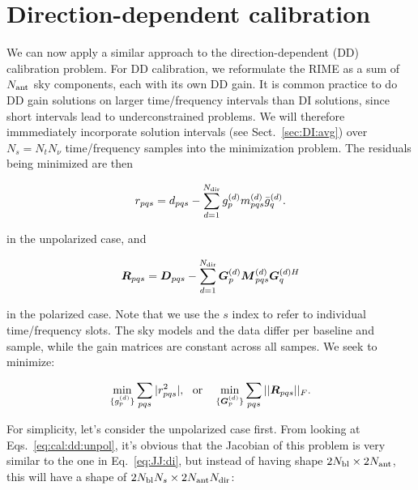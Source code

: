 \documentclass[useAMS,usenatbib]{mn2e}
\newcommand{\mat}[1]{{\bmath{#1}}}
\newcommand{\DD}{\mat{D}}
\newcommand{\MM}{\mat{M}}
\newcommand{\RR}{\mat{R}}
\newcommand{\GG}{\mat{G}}
\begin{document}
\section{Direction-dependent calibration}

\newcommand{\Ns}{N_s}

We can now apply a similar approach to the direction-dependent (DD) calibration problem. For DD calibration, we reformulate
the RIME as a sum of $N_\mathrm{ant}$ sky components, each with its own DD gain. 
It is common practice to do DD gain solutions on larger time/frequency intervals than DI 
solutions, since short intervals lead to underconstrained
problems. We will therefore immmediately incorporate solution intervals (see Sect.~\ref{sec:DI:avg}) 
over $\Ns=N_t N_\nu$ time/frequency samples into the  minimization problem. The residuals being minimized
are then

\newcommand{\GGd}{\GG^{(d)}}
\newcommand{\GGdH}{\GG^{(d)H}}
\newcommand{\MMd}{\MM^{(d)}}
\newcommand{\YYd}{\YY^{(d)}}
\newcommand{\YYdH}{\YY^{(d)H}}
\newcommand{\YYc}{\YY^{(c)}}
\newcommand{\YYcH}{\YY^{(c)H}}
\newcommand{\ggd}{g^{(d)}}
\newcommand{\ggdH}{\bar{g}^{(d)}}
\newcommand{\ggc}{g^{(c)}}
\newcommand{\ggcH}{\bar{g}^{(c)}}
\newcommand{\mmc}{m^{(c)}}
\newcommand{\mmd}{m^{(d)}}
\newcommand{\mmcH}{\bar{m}^{(c)}}
\newcommand{\mmdH}{\bar{m}^{(d)}}
\newcommand{\yyd}{y^{(d)}}
\newcommand{\yydH}{\bar{y}^{(d)}}
\newcommand{\yyc}{y^{(c)}}
\newcommand{\yycH}{\bar{y}^{(c)}}

\begin{equation}
\label{eq:cal:dd:unpol}
r_{pqs} = d_{pqs} - \sum_{d=1}^{\Nd} \ggd_p \mmd_{pqs} \ggdH_q.
\end{equation}

in the unpolarized case, and

\begin{equation}
\label{eq:cal:dd:pol}
\RR_{pqs} = \DD_{pqs} - \sum_{d=1}^{\Nd} \GGd_p \MMd_{pqs} \GGdH_q
\end{equation}

in the polarized case. Note that we use the $s$ index to refer to individual time/frequency slots. The sky models and the 
data differ per baseline and sample, while the gain matrices are constant across all sampes. We seek to minimize:


\[
\min_{\{\ggd_p\}}\sum_{pqs}|r^2_{pqs}|,~~\mathrm{or}~~~\min_{\{\GGd_p\}}\sum_{pqs}||\RR_{pqs}||_F.
\]

For simplicity, let's consider the unpolarized case first. From looking at Eqs.~\ref{eq:cal:dd:unpol}, it's obvious that the 
Jacobian of this problem is very similar to the one 
in Eq.~\ref{eq:JJ:di}, but instead of having shape $2N_\mathrm{bl}\times2N_\mathrm{ant}$, this will have a 
shape of $2\Nbl\Ns\times 2\Na\Nd$:
\end{document}
